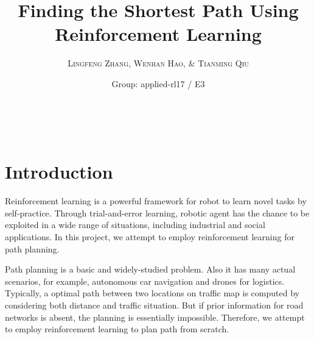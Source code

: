 \documentclass[a4paper, 11pt]{article} %
\title{\textbf{Finding the Shortest Path Using Reinforcement Learning}} %
\author{\textsc{Lingfeng Zhang, Wenhan Hao, $\&$ Tianming Qiu} %
\\{\textit{}}} %
\date{Group: applied-rl17 / E3} %
\makeatletter
\renewcommand{\maketitle}{ %
\begin{flushright} %
{\LARGE\@title} %

\vspace{50pt} %

{\large\@author} %
\\\@date %

\vspace{40pt} %
\end{flushright}
}
\makeatother
\begin{document}
\maketitle %



\section{Introduction}
Reinforcement learning is a powerful framework for robot to learn novel tasks by
self-practice. Through trial-and-error learning, robotic agent has the chance to
be exploited in a wide range of situations, including industrial and social
applications. In this project, we attempt to employ reinforcement learning for
path planning.

Path planning is a basic and widely-studied problem. Also it has many actual
scenarios, for example, autonomous car navigation and drones for logistics.
Typically, a optimal path between two locations on traffic map is computed by
considering both distance and traffic situation. But if prior information for
road networks is absent, the planning is essentially impossible. Therefore,
we attempt to employ reinforcement learning to plan path from scratch.
\end{document}
